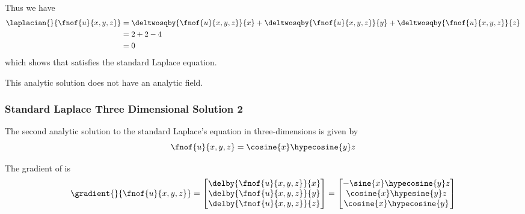 Thus we have
\begin{equation}
  \begin{aligned}
    \laplacian{}{\fnof{u}{x,y,z}}&=\deltwosqby{\fnof{u}{x,y,z}}{x}+\deltwosqby{\fnof{u}{x,y,z}}{y}+\deltwosqby{\fnof{u}{x,y,z}}{z} \\
    &=2+2-4\\
    &=0
  \end{aligned}
\end{equation}
which shows that  satisfies the standard Laplace equation.

This analytic solution does not have an analytic field.

\subsubsection{Standard Laplace Three Dimensional Solution 2}
 
The second analytic solution to the standard Laplace's equation in three-dimensions is given by
\begin{equation}
  \fnof{u}{x,y,z}=\cosine{x}\hypecosine{y}z
  \label{eqn:StandardLaplaceThreeDAnalytic2}
\end{equation}

The gradient of  is
\begin{equation}
  \gradient{}{\fnof{u}{x,y,z}}=\begin{bmatrix}
  \delby{\fnof{u}{x,y,z}}{x} \\
  \delby{\fnof{u}{x,y,z}}{y} \\
  \delby{\fnof{u}{x,y,z}}{z}
  \end{bmatrix}=\begin{bmatrix}
  -\sine{x}\hypecosine{y}z \\
  \cosine{x}\hypesine{y}z \\
  \cosine{x}\hypecosine{y}
  \end{bmatrix}
  \label{eqn:StandardLaplaceThreeDAnalyticGradient2}
\end{equation}


